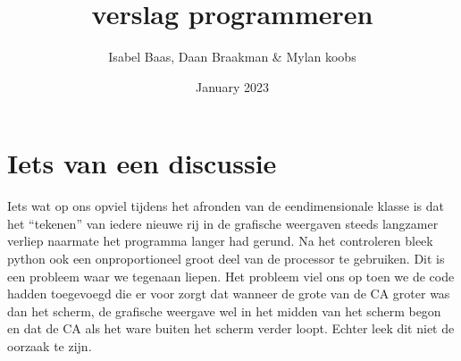 \documentclass{article}
\title{verslag programmeren}
\author{Isabel Baas, Daan Braakman \& Mylan koobs}
\date{January 2023}
\begin{document}
\maketitle

\section{Iets van een discussie}
Iets wat op ons opviel tijdens het afronden van de eendimensionale klasse is dat het “tekenen” van iedere nieuwe rij in de grafische weergaven steeds langzamer verliep naarmate het programma langer had gerund. Na het controleren bleek python ook een onproportioneel groot deel van de processor te gebruiken. Dit is een probleem waar we tegenaan liepen. Het probleem viel ons op toen we de code hadden toegevoegd die er voor zorgt dat wanneer de grote van de CA groter was dan het scherm, de grafische weergave wel in het midden van het scherm begon en dat de CA als het ware buiten het scherm verder loopt. Echter leek dit niet de oorzaak te zijn.
\end{document}
